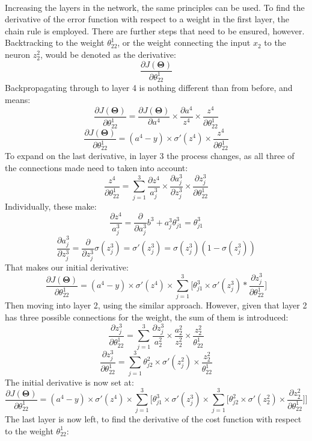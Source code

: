 \documentclass[a4paper,12pt]{article}
\begin{document}
\\
Increasing the layers in the network, the same principles can be used. To find the derivative of the error function with respect to a weight in the first layer, the chain rule is employed. There are further steps that need to be ensured, however. Backtracking to the weight $\theta^1_{22}$, or the weight connecting the input $x_2$ to the neuron $z^2_2$, would be denoted as the derivative:
\[\frac{\partial J(\boldsymbol{\Theta})}{\partial \theta^1_{22}}\]
Backpropagating through to layer 4 is nothing different than from before, and means:
\[\frac{\partial J(\boldsymbol{\Theta})}{\partial \theta^1_{22}} = \frac{\partial J(\boldsymbol{\Theta})}{\partial a^4} \times \frac{\partial a^4}{z^4} \times \frac{z^4}{\partial \theta_{22}^1}\]
\[\frac{\partial J(\boldsymbol{\Theta})}{\partial \theta^1_{22}} = (a^4 - y) \times \sigma'(z^4) \times \frac{z^4}{\partial \theta_{22}^1}\]
To expand on the last derivative, in layer 3 the process changes, as all three of the connections made need to taken into account:
\[\frac{z^4}{\partial \theta_{22}^1} = \sum_{j=1}^3 \frac{\partial z^4}{a^3_j} \times \frac{\partial a^3_j}{\partial z^3_j} \times \frac{\partial z^3_j}{\partial \theta_{22}^1}\]
Individually, these make:
\[\frac{\partial z^4}{a^3_j} = \frac{\partial}{\partial a^3_j} b^3 + a^3_j\theta^3_{j1} = \theta^3_{j1}\]
\[\frac{\partial a^3_j}{\partial z^3_j} = \frac{\partial }{\partial z^3_j} \sigma(z^3_j) = \sigma'(z^3_j) = \sigma(z^3_j)(1-\sigma(z^3_j))\]
That makes our initial derivative:
\[\frac{\partial J(\boldsymbol{\Theta})}{\partial \theta^1_{22}} = (a^4 - y) \times \sigma'(z^4) \times \sum_{j=1}^3 \Big[\theta^3_{j1} \times \sigma'(z^3_j) * \frac{\partial z^3_j}{\partial \theta^1_{22}}\Big]\]
Then moving into layer 2, using the similar approach. However, given that layer 2 has three possible connections for the weight, the sum of them is introduced:
\[\frac{\partial z^3_j}{\partial \theta^1_{22}} = \sum_{j=1}^{3} \frac{\partial z^3_j}{a^2_2} \times \frac{a^2_2}{z^2_2} \times \frac{z^2_2}{\theta_{22}^1}\]
\[\frac{\partial z^3_j}{\partial \theta^1_{22}} = \sum_{j=1}^{3} \theta^2_{j2} \times \sigma'(z^2_j) \times \frac{z^2_2}{\theta_{22}^1}\]
The initial derivative is now set at:
\[\frac{\partial J(\boldsymbol{\Theta})}{\partial \theta^1_{22}} = (a^4 - y) \times \sigma'(z^4) \times \sum_{j=1}^3 \Big[\theta^3_{j1} \times \sigma'(z^3_j) \times \sum_{j=1}^{3} \Big[ \theta^2_{j2} \times \sigma'(z^2_2) \times \frac{\partial z^2_2}{\partial \theta_{22}^1}\Big]\Big]\]
The last layer is now left, to find the derivative of the cost function with respect to the weight $\theta_{22}^1$:
\end{document}
